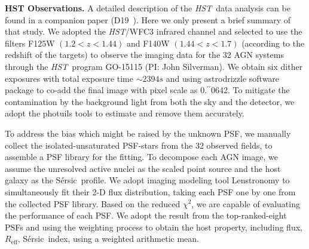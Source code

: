 \documentclass{natureprintstyle}
\newcommand{\hst}{{\it HST}}
\newcommand{\mbh}{$\mathcal M_{\rm BH}$}
\newcommand{\halpha}{${\it H}\alpha$}
\newcommand{\hbeta}{${\it H}\beta$}
\newcommand{\sersic}{S\'ersic}
\newcommand{\lenstronomy}{{\sc Lenstronomy}}
\newcommand{\reff}{{$R_{\mathrm{eff}}$}}
\newcommand{\Mgii}{Mg$_{\rm II}$}
\newcommand{\Civ}{C$_{\rm IV}$}
\newcommand{\farcs}{\mbox{\ensuremath{.\!\!^{\prime\prime}}}}%
\begin{document}

\textbf{HST Observations.} 
A detailed description of the \hst\ data analysis can be found in a companion paper (D19~\cite{Ding2019}). Here we only present a brief summary of that study. We adopted the \hst/WFC3 infrared channel and selected to use the filters F125W $(1.2<z<1.44)$ and F140W $(1.44<z<1.7)$ (according to the redshift of the targets) to observe the imaging data for the 32 AGN systems through the \hst\ program GO-15115 (PI: John Silverman). We obtain six dither exposures with total exposure time $\sim2394s$ and using  {\sc astrodrizzle} software package to co-add the final image with pixel scale as 0\farcs0642. To mitigate the contamination by the background light from both the sky and the detector, we adopt the {\sc photuils} tools to estimate and remove them accurately.

To address the bias which might be raised by the unknown PSF, we manually collect the isolated-unsaturated PSF-stars from the 32 observed fields, to assemble a PSF library for the fitting. To decompose each AGN image, we assume the unresolved active nuclei as the scaled point source and the host galaxy as the \sersic\ profile. We adopt imaging modeling tool \lenstronomy\cite{lenstronomy} to simultaneously fit their 2-D flux distribution, taking each PSF one by one from the collected PSF library. Based on the reduced $\chi^2$, we are capable of evaluating the performance of each PSF. We adopt the result from the top-ranked-eight PSFs and using the weighting process to obtain the host property, including flux, \reff, \sersic\ index, using a weighted arithmetic mean.
\end{document}
